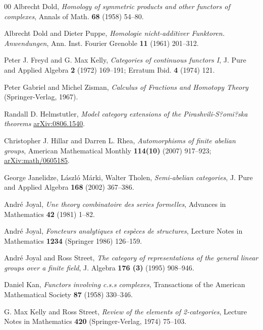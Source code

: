 \documentclass[a4paper,12pt,reqno]{amsart}
\theoremstyle{definition}
\theoremstyle{fact}
\theoremstyle{genquest}
\theoremstyle{step}
\begin{document}
\begin{thebibliography}{00}
 Albrecht Dold, \textit{Homology of symmetric products and other functors of complexes}, Annals of Math. \textbf{68} (1958) 54--80.\label{Dold}
 
 Albrecht Dold and Dieter Puppe, \textit{Homologie nicht-additiver Funktoren. Anwendungen}, Ann. Inst. Fourier Grenoble \textbf{11} (1961) 201--312.\label{DoldPuppe}

 Peter J. Freyd and G. Max Kelly, \textit{Categories of continuous functors I}, J. Pure and Applied Algebra \textbf{2} (1972) 169--191; Erratum Ibid. \textbf{4} (1974) 121.\label{FreydKelly}

 Peter Gabriel and Michel Zisman, \textit{Calculus of Fractions and Homotopy Theory} (Springer-Verlag, 1967).\label{GabZis} 

 Randall D. Helmstutler, \textit{Model category extensions of the Pirashvili-S?omi?ska theorems} \url{arXiv:0806.1540}.\label{Helm}

 Christopher J. Hillar and Darren L. Rhea, \textit{Automorphisms of finite abelian groups}, American Mathematical Monthly \textbf{114(10)} (2007) 917--923; \url{arXiv:math/0605185}.\label{HillarDarren2007}

 George Janelidze, L\'aszl\'o M\'arki, Walter Tholen, \textit{Semi-abelian categories}, J. Pure and Applied Algebra \textbf{168} (2002) 367--386.\label{JMT}

 Andr\'e Joyal, \textit{Une theory combinatoire des series formelles}, Advances in Mathematics \textbf{42} (1981) 1--82.\label{Species}

 Andr\'e Joyal, \textit{Foncteurs analytiques et esp\`eces de structures}, Lecture Notes in Mathematics \textbf{1234} (Springer 1986) 126--159.\label{AnalFunct} 

 Andr\'e Joyal and Ross Street, \textit{The category of representations of the general linear groups over a finite field}, J. Algebra \textbf{176 (3)} (1995) 908--946.\label{repfgl}

 Daniel Kan, \textit{Functors involving c.s.s complexes}, Transactions of the American Mathematical Society \textbf{87} (1958) 330--346.\label{Kan}

 G. Max Kelly and Ross Street, \textit{Review of the elements of 2-categories}, Lecture Notes in Mathematics \textbf{420} (Springer-Verlag, 1974) 75--103.\label{KelSt1974}


\end{thebibliography}
\end{document}
